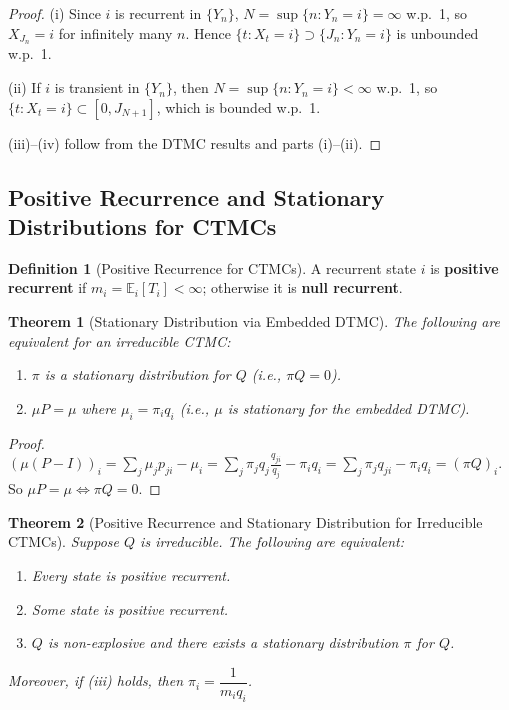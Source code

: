 \documentclass[12pt, a4paper]{article}
\theoremstyle{definition}
\newtheorem{definition}{Definition}[section]
\theoremstyle{plain}
\newtheorem{theorem}{Theorem}[section]
\newcommand{\EE}{\mathbb{E}}
\begin{document}
\begin{proof}
(i) Since $i$ is recurrent in $\{Y_n\}$, $N = \sup\{n : Y_n = i\} = \infty$ w.p.\ 1, so $X_{J_n} = i$ for infinitely many $n$. Hence $\{t : X_t = i\} \supset \{J_n : Y_n = i\}$ is unbounded w.p.\ 1.

(ii) If $i$ is transient in $\{Y_n\}$, then $N = \sup\{n : Y_n = i\} < \infty$ w.p.\ 1, so $\{t : X_t = i\} \subset [0, J_{N+1}]$, which is bounded w.p.\ 1.

(iii)–(iv) follow from the DTMC results and parts (i)–(ii).
\end{proof}

\subsection{Positive Recurrence and Stationary Distributions for CTMCs}

\begin{definition}[Positive Recurrence for CTMCs]
A recurrent state $i$ is \textbf{positive recurrent} if $m_i = \EE_i[T_i] < \infty$; otherwise it is \textbf{null recurrent}.
\end{definition}

\begin{theorem}[Stationary Distribution via Embedded DTMC]
The following are equivalent for an irreducible CTMC:
\begin{enumerate}[label=(\roman*)]
  \item $\pi$ is a stationary distribution for $Q$ (i.e., $\pi Q = 0$).
  \item $\mu P = \mu$ where $\mu_i = \pi_i q_i$ (i.e., $\mu$ is stationary for the embedded DTMC).
\end{enumerate}
\end{theorem}

\begin{proof}
$(\mu(P-I))_i = \sum_j \mu_j p_{ji} - \mu_i = \sum_j \pi_j q_j \frac{q_{ji}}{q_j} - \pi_i q_i = \sum_j \pi_j q_{ji} - \pi_i q_i = (\pi Q)_i$.
So $\mu P = \mu \Leftrightarrow \pi Q = 0$.
\end{proof}

\begin{theorem}[Positive Recurrence and Stationary Distribution for Irreducible CTMCs]
\label{thm:ctmc-posrec}
Suppose $Q$ is irreducible. The following are equivalent:
\begin{enumerate}[label=(\roman*)]
  \item Every state is positive recurrent.
  \item Some state is positive recurrent.
  \item $Q$ is non-explosive and there exists a stationary distribution $\pi$ for $Q$.
\end{enumerate}
Moreover, if (iii) holds, then $\pi_i = \dfrac{1}{m_i q_i}$.
\end{theorem}
\end{document}

